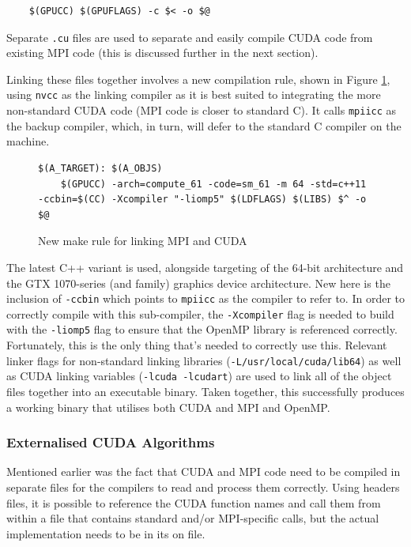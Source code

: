 \documentclass[conference]{IEEEtran}
\begin{document}
\begin{lstlisting}[breaklines]
%.o: %.cu
    $(GPUCC) $(GPUFLAGS) -c $< -o $@
\end{lstlisting}

Separate \texttt{.cu} files are used to separate and easily compile CUDA code from existing MPI code (this is discussed further in the next section).

Linking these files together involves a new compilation rule, shown in Figure \ref{fig:nvccmpiicc}, using \texttt{nvcc} as the linking compiler as it is best suited to integrating the more non-standard CUDA code (MPI code is closer to standard C). It calls \texttt{mpiicc} as the backup compiler, which, in turn, will defer to the standard C compiler on the machine.

\begin{figure}[!h]
    \centering
    \begin{lstlisting}[breaklines]
$(A_TARGET): $(A_OBJS)
    $(GPUCC) -arch=compute_61 -code=sm_61 -m 64 -std=c++11 -ccbin=$(CC) -Xcompiler "-liomp5" $(LDFLAGS) $(LIBS) $^ -o $@
    \end{lstlisting}
    \caption{New make rule for linking MPI and CUDA}
    \label{fig:nvccmpiicc}
\end{figure}

The latest C++ variant is used, alongside targeting of the 64-bit architecture and the GTX 1070-series (and family) graphics device architecture. New here is the inclusion of \texttt{-ccbin} which points to \texttt{mpiicc} as the compiler to refer to. In order to correctly compile with this sub-compiler, the \texttt{-Xcompiler} flag is needed to build with the \texttt{-liomp5} flag to ensure that the OpenMP library is referenced correctly. Fortunately, this is the only thing that's needed to correctly use this. Relevant linker flags for non-standard linking libraries (\texttt{-L/usr/local/cuda/lib64}) as well as CUDA linking variables (\texttt{-lcuda -lcudart}) are used to link all of the object files together into an executable binary. Taken together, this successfully produces a working binary that utilises both CUDA and MPI and OpenMP.

\subsubsection{Externalised CUDA Algorithms}

Mentioned earlier was the fact that CUDA and MPI code need to be compiled in separate files for the compilers to read and process them correctly. Using headers files, it is possible to reference the CUDA function names and call them from within a file that contains standard and/or MPI-specific calls, but the actual implementation needs to be in its on file.
\end{document}
